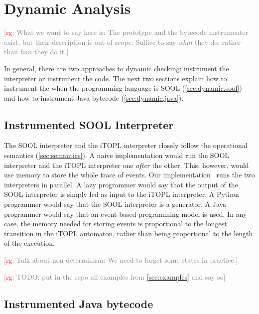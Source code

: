 \documentclass[preprint]{sigplanconf} %
\newcommand{\note}[2]{\textcolor{gray}{[\textcolor{red}{#1}: #2]}}
\newcommand{\rg}[1]{\note{rg}{#1}}
\theoremstyle{definition}
\theoremstyle{remark}
\begin{document}
\section{Dynamic Analysis}\label{sec:dynamic} %

\rg{What we want to say here is:
The prototype and the bytecode instrumenter exist, but their description is out of scope.
Suffice to say \emph{what} they do, rather than \emph{how} they do it.}

In general, there are two approaches to dynamic checking: instrument the interpreter or instrument the code.
The next two sections explain how to instrument the 	 when the programming language is SOOL (\autoref{sec:dynamic.sool}) and how to instrument Java bytecode (\autoref{sec:dynamic.java}).

\subsection{Instrumented SOOL Interpreter}\label{sec:dynamic.sool} %

The SOOL interpreter and the iTOPL interpreter closely follow the operational semantics (\autoref{sec:semantics}).
A naive implementation would run the SOOL interpreter and the iTOPL interpreter one \emph{after} the other.
This, however, would use memory to store the whole trace of events.
Our implementation~\cite{web:topl.prototype} runs the two interpreters in parallel.
A lazy programmer would say that the output of the SOOL interpreter is simply fed as input to the iTOPL interpreter.
A Python programmer would say that the SOOL interpreter is a generator.
A Java programmer would say that an event-based programming model is used.
In any case, the memory needed for storing events is proportional to the longest transition in the iTOPL automaton, rather than being proportional to the length of the execution.

\rg{Talk about non-determinism: We need to forget some states in practice.}

\rg{TODO: put in the repo all examples from \autoref{sec:examples} and say so}

\subsection{Instrumented Java bytecode}\label{sec:dynamic.java} %

\end{document}
